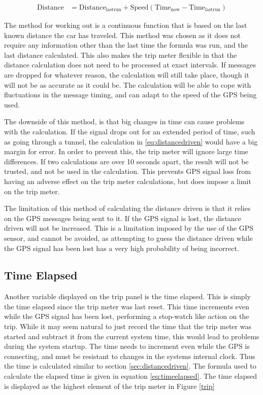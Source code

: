 \begin{align}
\label{eq:distancedriven}
\mathrm{Distance} &=\mathrm{Distance}_\mathrm{lastrun} + \mathrm{Speed}(\mathrm{Time}_\mathrm{now}-\mathrm{Time}_\mathrm{lastrun})
\end{align}

The method for working out is a continuous function that is based on the last known distance the car has traveled. This method was chosen as it does not require any information other than the last time the formula was run, and the last distance calculated. This also makes the trip meter flexible in that the distance calculation does not need to be processed at exact intervals. If messages are dropped for whatever reason, the calculation will still take place, though it will not be as accurate as it could be. The calculation will be able to cope with fluctuations in the message timing, and can adapt to the speed of the GPS being used.

The downside of this method, is that big changes in time can cause problems with the calculation. If the signal drops out for an extended period of time, such as going through a tunnel, the calculation in \ref{eq:distancedriven} would have a big margin for error. In order to prevent this, the trip meter will ignore large time differences. If two calculations are over 10 seconds apart, the result will not be trusted, and not be used in the calculation. This prevents GPS signal loss from having an adverse effect on the trip meter calculations, but does impose a limit on the trip meter.

The limitation of this method of calculating the distance driven is that it relies on the GPS messages being sent to it. If the GPS signal is lost, the distance driven will not be increased. This is a limitation imposed by the use of the GPS sensor, and cannot be avoided, as attempting to guess the distance driven while the GPS signal has been lost has a very high probability of being incorrect.

\subsection{Time Elapsed}

Another variable displayed on the trip panel is the time elapsed. This is simply the time elapsed since the trip meter was last reset. This time increments even while the GPS signal has been lost, performing a stop-watch like action on the trip. While it may seem natural to just record the time that the trip meter was started and subtract it from the current system time, this would lead to problems during the system startup. The time needs to increment even while the GPS is connecting, and must be resistant to changes in the systems internal clock. Thus the time is calculated similar to section \ref{sec:distancedriven}. The formula used to calculate the elapsed time is given in equation \ref{eq:timeelapsed}. The time elapsed is displayed as the highest element of the trip meter in Figure \ref{trip}

